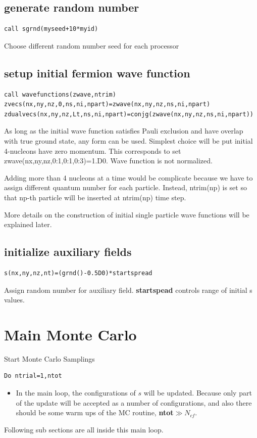 \documentclass[10pt]{book}
\begin{document}
\subsection{generate random number} 
\begin{lstlisting}[frame=single]
call sgrnd(myseed+10*myid)
\end{lstlisting}
Choose different random number seed for each processor

\subsection{setup initial fermion wave function} 
\begin{lstlisting}[frame=single]
call wavefunctions(zwave,ntrim)
zvecs(nx,ny,nz,0,ns,ni,npart)=zwave(nx,ny,nz,ns,ni,npart)
zdualvecs(nx,ny,nz,Lt,ns,ni,npart)=conjg(zwave(nx,ny,nz,ns,ni,npart))
\end{lstlisting}
As long as the initial wave function satisfies Pauli exclusion and 
have overlap with true ground state, any form can be used. 
Simplest choice will be put initial 4-nucleons have zero momentum.
This corresponds to set zwave(nx,ny,nz,0:1,0:1,0:3)=1.D0.
Wave function is not normalized. 

Adding more than 4 nucleons at a time would be complicate because 
we have to assign different quantum number for each particle. 
Instead, ntrim(np) is set so that np-th particle will be 
inserted at ntrim(np) time step.

{\color{red} More details on the construction of initial single particle wave functions
will be explained later.}

\subsection{initialize auxiliary fields} 
\begin{lstlisting}[frame=single]
s(nx,ny,nz,nt)=(grnd()-0.5D0)*startspread
\end{lstlisting}
Assign random number for auxiliary field. {\bf startspead} controls range of initial s values.

\section{Main Monte Carlo}
Start Monte Carlo Samplings
\begin{lstlisting}[frame=single]
Do ntrial=1,ntot
\end{lstlisting}
\begin{itemize}
	\item In the main loop, the configurations of $s$ will be updated. 
	      Because only part of the update will be accepted as a number of configurations,
	      and also there should be some warm ups of the MC routine,
	      {\bf ntot}$\gg N_{cf}$.
\end{itemize} 
Following sub sections are all inside this main loop.
\end{document}
